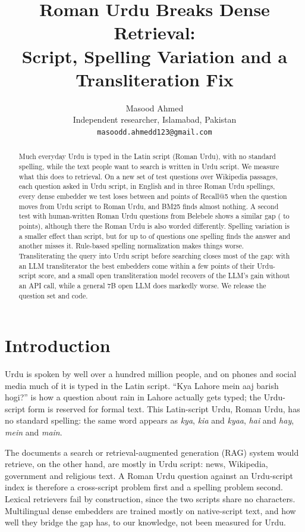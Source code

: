 \documentclass[11pt]{article}
\title{Roman Urdu Breaks Dense Retrieval:\\Script, Spelling Variation and a Transliteration Fix}
\author{Masood Ahmed \\
  Independent researcher, Islamabad, Pakistan \\
  \texttt{masoodd.ahmedd123@gmail.com}}
\begin{document}
\maketitle

\begin{abstract}
Much everyday Urdu is typed in the Latin script (Roman Urdu), with no standard spelling, while the text people want to search is written in Urdu script. We measure what this does to retrieval. On a new set of \WikiNTest{} test questions over \WikiNPassages{} Wikipedia passages, each question asked in Urdu script, in English and in three Roman Urdu spellings, every dense embedder we test loses between \WikiDropMin{} and \WikiDropMax{} points of Recall@5 when the question moves from Urdu script to Roman Urdu, and BM25 finds almost nothing. A second test with human-written Roman Urdu questions from Belebele shows a similar gap (\BbDropMin{} to \BbDropMax{} points), although there the Roman Urdu is also worded differently. Spelling variation is a smaller effect than script, but for up to \WikiDisagreeMax{} of questions one spelling finds the answer and another misses it. Rule-based spelling normalization makes things worse. Transliterating the query into Urdu script before searching closes most of the gap: with an LLM transliterator the best embedders come within a few points of their Urdu-script score, and a small open transliteration model recovers \MtwoMShare{} of the LLM's gain without an API call, while a general 7B open LLM does markedly worse. We release the question set and code.
\end{abstract}

\section{Introduction}

Urdu is spoken by well over a hundred million people, and on phones and social media much of it is typed in the Latin script. ``Kya Lahore mein aaj barish hogi?'' is how a question about rain in Lahore actually gets typed; the Urdu-script form is reserved for formal text. This Latin-script Urdu, Roman Urdu, has no standard spelling: the same word appears as \textit{kya}, \textit{kia} and \textit{kyaa}, \textit{hai} and \textit{hay}, \textit{mein} and \textit{main}.

The documents a search or retrieval-augmented generation (RAG) system would retrieve, on the other hand, are mostly in Urdu script: news, Wikipedia, government and religious text. A Roman Urdu question against an Urdu-script index is therefore a cross-script problem first and a spelling problem second. Lexical retrievers fail by construction, since the two scripts share no characters. Multilingual dense embedders are trained mostly on native-script text, and how well they bridge the gap has, to our knowledge, not been measured for Urdu.
\end{document}
